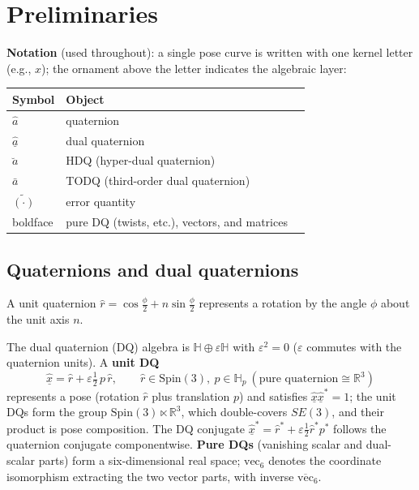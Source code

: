 \section{Preliminaries}

\textbf{Notation} (used throughout): a single pose curve is written with one kernel letter (e.g., $x$); the ornament above the letter indicates the algebraic layer:

\begin{center}
\begin{tabularx}{\linewidth}{@{}llX@{}}
\toprule
Symbol & Object \\
\midrule
$\hat a$ & quaternion \\
$\hat{\underline a}$ & dual quaternion \\
$\breve a$ & HDQ (hyper-dual quaternion) \\
$\bar a$ & TODQ (third-order dual quaternion) \\
$\tilde{(\cdot)}$ & error quantity \\
boldface & pure DQ (twists, etc.), vectors, and matrices \\
\bottomrule
\end{tabularx}
\end{center}

\subsection{Quaternions and dual quaternions}

A unit quaternion $\hat r=\cos\frac\phi2+n\sin\frac\phi2$ represents a rotation by the angle $\phi$ about the unit axis $n$.

The dual quaternion (DQ) algebra is $\mathbb H\oplus\varepsilon\mathbb H$ with $\varepsilon^2=0$ ($\varepsilon$ commutes with the quaternion units). A \textbf{unit DQ}
\begin{equation}
\hat{\underline x}=\hat r+\varepsilon\tfrac12\,p\,\hat r,\qquad \hat r\in\mathrm{Spin}(3),\ p\in\mathbb H_p\ (\text{pure quaternion}\cong\mathbb R^3)
\tag{2.1}\label{eq:2.1}
\end{equation}
represents a pose (rotation $\hat r$ plus translation $p$) and satisfies $\hat{\underline x}\hat{\underline x}^*=1$; the unit DQs form the group $\mathrm{Spin}(3)\ltimes\mathbb R^3$, which double-covers $SE(3)$, and their product is pose composition. The DQ conjugate $\hat{\underline x}^*=\hat r^*+\varepsilon\tfrac12\hat r^*p^*$ follows the quaternion conjugate componentwise. \textbf{Pure DQs} (vanishing scalar and dual-scalar parts) form a six-dimensional real space; $\mathrm{vec}_6$ denotes the coordinate isomorphism extracting the two vector parts, with inverse $\overline{\mathrm{vec}}_6$.

